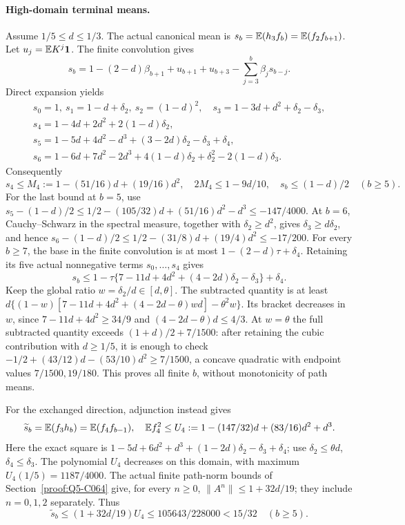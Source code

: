 \paragraph{High-domain terminal means.}
Assume \(1/5\le d\le1/3\). The actual canonical mean is
\(s_b=\mathbb E(h_3f_b)=\mathbb E(f_2f_{b+1})\).
Let \(u_j=\mathbb E K^j\mathbf1\). The finite convolution gives
\[
 s_b=1-(2-d)\beta_{b+1}+u_{b+1}+u_{b+3}
                       -\sum_{j=3}^b\beta_js_{b-j}.
\]
Direct expansion yields
\[
\begin{gathered}
 s_0=1,\ s_1=1-d+\delta_2,\ s_2=(1-d)^2,\quad
 s_3=1-3d+d^2+\delta_2-\delta_3,\\
 s_4=1-4d+2d^2+2(1-d)\delta_2,\\
 s_5=1-5d+4d^2-d^3+(3-2d)\delta_2-\delta_3+\delta_4,\\
 s_6=1-6d+7d^2-2d^3+4(1-d)\delta_2+\delta_2^2-2(1-d)\delta_3.
\end{gathered}
\]
Consequently
\begin{equation}\label{eq:unit-ordinary:three-high-means}
 s_4\le M_4:=1-(51/16)d+(19/16)d^2,
 \quad 2M_4\le1-9d/10,\quad
 s_b\le(1-d)/2\quad(b\ge5).
\end{equation}
For the last bound at \(b=5\), use
\(s_5-(1-d)/2\le1/2-(105/32)d+(51/16)d^2-d^3
\le-147/4000\).
At \(b=6\), Cauchy--Schwarz in the spectral measure, together with
\(\delta_2\ge d^2\), gives \(\delta_3\ge d\delta_2\), and hence
\(s_6-(1-d)/2\le1/2-(31/8)d+(19/4)d^2\le-17/200\).
For every \(b\ge7\), the base in the finite convolution is at most
\(1-(2-d)\tau+\delta_4\). Retaining its five actual nonnegative
terms \(s_0,\ldots,s_4\) gives
\[
 s_b\le1-\tau\{7-11d+4d^2+(4-2d)\delta_2-\delta_3\}+\delta_4.
\]
Keep the global ratio \(w=\delta_2/d\in[d,\theta]\).
The subtracted quantity is at least
\(d\{(1-w)[7-11d+4d^2+(4-2d-\theta)wd]-\theta^2w\}\).
Its bracket decreases in \(w\), since
\(7-11d+4d^2\ge34/9\) and \((4-2d-\theta)d\le4/3\).
At \(w=\theta\) the full subtracted quantity exceeds
\((1+d)/2+7/1500\): after
retaining the cubic contribution with \(d\ge1/5\), it is enough
to check \(-1/2+(43/12)d-(53/10)d^2\ge7/1500\),
a concave quadratic with endpoint values \(7/1500,19/180\).
This proves all finite \(b\), without monotonicity of path means.

For the exchanged direction, adjunction instead gives
\[
 \widetilde s_b=\mathbb E(f_3h_b)=\mathbb E(f_4f_{b-1}),\quad
 \mathbb E f_4^2\le U_4:=1-(147/32)d+(83/16)d^2+d^3.
\]
Here the exact square is
\(1-5d+6d^2+d^3+(1-2d)\delta_2-\delta_3+\delta_4\); use
\(\delta_2\le\theta d\), \(\delta_4\le\delta_3\).
The polynomial \(U_4\) decreases on this domain, with maximum
\(U_4(1/5)=1187/4000\). The actual finite path-norm bounds of
Section~\ref{proof:Q5-C064} give, for every \(n\ge0\),
\(\|A^n\|\le1+32d/19\); they include \(n=0,1,2\) separately.
Thus
\begin{equation}\label{eq:unit-ordinary:three-high-exchanged}
 \widetilde s_b\le(1+32d/19)U_4
                 \le105643/228000<15/32\quad(b\ge5).
\end{equation}

